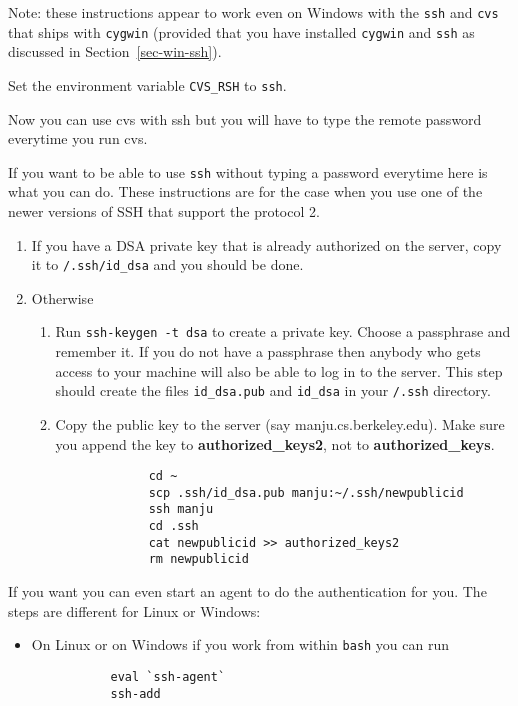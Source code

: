 \documentclass{article}
\def\t#1{{\tt #1}}
\def\cvshost{manju}
\begin{document}
{ Note: these instructions appear to work even on Windows with the \t{ssh} and
\t{cvs} that ships with \t{cygwin} (provided that you have installed
\t{cygwin} and \t{ssh} as discussed in Section~\ref{sec-win-ssh}).

 Set the environment variable \t{CVS\_RSH} to \t{ssh}. 

 Now you can use cvs with ssh but you will have to type the remote password
 everytime you run cvs. 

 If you want to be able to use \t{ssh} without typing a password everytime
here is what you can do. These instructions are for the case when you use one
of the newer versions of SSH that support the protocol 2. 

\begin{enumerate}
  \item If you have a DSA private key that is already authorized on 
        the server, copy it to \t{\home{}/.ssh/id\_dsa} and you 
        should be done.
  \item Otherwise
     \begin{enumerate}
       \item Run \t{ssh-keygen -t dsa} to create a private key. 
        Choose a passphrase and remember it. 
        If you do not have a passphrase then anybody who gets
        access to your machine will also be able to log in to the server. This
        step should create the files \t{id\_dsa.pub} and \t{id\_dsa} in your 
        \t{\home{}/.ssh} directory.
       \item Copy the public key to the server (say \cvshost.cs.berkeley.edu).
          Make sure you append the key to {\bf authorized\_keys2}, not to {\bf
          authorized\_keys}.  
             \begin{verbatim}
             cd ~
             scp .ssh/id_dsa.pub manju:~/.ssh/newpublicid
             ssh manju
             cd .ssh
             cat newpublicid >> authorized_keys2
             rm newpublicid
             \end{verbatim}
     \end{enumerate}
\end{enumerate}


 If you want you can even start an agent to do the authentication for
you. The steps are different for Linux or Windows:
   \begin{itemize}
     \item On Linux or on Windows if you work from within \t{bash} you can run
        \begin{verbatim} 
           eval `ssh-agent`
           ssh-add
        \end{verbatim}


\end{itemize}}
\end{document}
